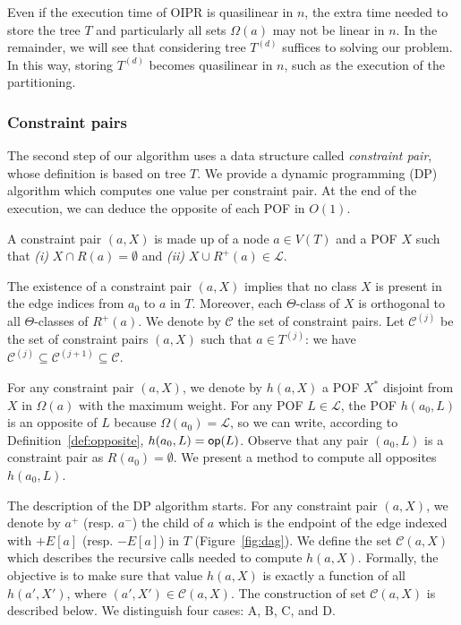 \documentclass[a4paper,UKenglish,numberwithinsect,cleveref, autoref]{lipics-v2021}
\newcommand{\opp}{\mbox{\textsf{op}}}
\begin{document}
Even if the execution time of OIPR is quasilinear in $n$, the extra time needed to store the tree $T$ and particularly all sets $\Omega(a)$ may not be linear in $n$. In the remainder, we will see that considering tree $T^{(d)}$ suffices to solving our problem. In this way, storing $T^{(d)}$ becomes quasilinear in $n$, such as the execution of the partitioning.

\subsubsection{Constraint pairs} \label{subsubsec:cp}

The second step of our algorithm uses a data structure called \textit{constraint pair}, whose definition is based on tree $T$. We provide a dynamic programming (DP) algorithm which computes one value per constraint pair. At the end of the execution, we can deduce the opposite of each POF in $O(1)$.

\begin{definition}
A constraint pair $(a,X)$ is made up of a node $a \in V(T)$ and a POF $X$ such that {\em (i)} $X \cap R(a) = \emptyset$ and {\em (ii)} $X \cup R^+(a) \in \mathcal{L}$.
\label{def:cp}
\end{definition}

The existence of a constraint pair $(a,X)$ implies that no class $X$ is present in the edge indices from $a_0$ to $a$ in $T$. Moreover, each $\Theta$-class of $X$ is orthogonal to all $\Theta$-classes of $R^+(a)$. We denote by $\mathcal{C}$ the set of constraint pairs. Let $\mathcal{C}^{(j)}$ be the set of constraint pairs $(a,X)$ such that $a\in T^{(j)}$: we have $\mathcal{C}^{(j)} \subseteq \mathcal{C}^{(j+1)} \subseteq \mathcal{C}$.

For any constraint pair $(a,X)$, we denote by $h(a,X)$ a POF $X^*$ disjoint from $X$ in $\Omega(a)$ with the maximum weight. For any POF $L \in \mathcal{L}$, the POF $h(a_0,L)$ is an opposite of $L$ because $\Omega(a_0) = \mathcal{L}$, so we can write, according to Definition~\ref{def:opposite}, $h(a_0,L) = \opp(L)$. Observe that any pair $(a_0,L)$ is a constraint pair as $R(a_0) = \emptyset$. We present a method to compute all opposites $h(a_0,L)$.

The description of the DP algorithm starts. For any constraint pair $(a,X)$, we denote by $a^+$ (resp. $a^-$) the child of $a$ which is the endpoint of the edge indexed with $+E\left[a\right]$ (resp. $-E\left[a\right]$) in $T$ (Figure~\ref{fig:dag}). 
We define the set $\mathcal{C}(a,X)$ which describes the recursive calls needed to compute $h(a,X)$. Formally, the objective is to make sure that value $h(a,X)$ is exactly a function of all $h(a',X')$, where $(a',X') \in \mathcal{C}(a,X)$.
The construction of set $\mathcal{C}(a,X)$ is described below. We distinguish four cases: A, B, C, and D.
\end{document}
